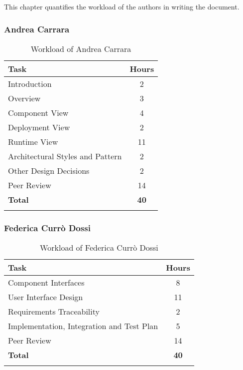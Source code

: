 This chapter quantifies the workload of the authors in writing the document.

\subsubsection{Andrea Carrara}
\renewcommand{\arraystretch}{1.5}
\begin{longtable}{|p{8.5cm}|c|}
    \hline \rowcolor{polimiblue!40}
    \textbf{Task} & \textbf{Hours} \\ \hline
    Introduction  & 2  \\ \hline
    Overview & 3 \\ \hline
    Component View & 4\\ \hline
    Deployment View & 2 \\ \hline
    Runtime View & 11 \\ \hline
    Architectural Styles and Pattern  & 2 \\ \hline
    Other Design Decisions  & 2 \\ \hline
    Peer Review & 14 \\ \hline
    \hline \rowcolor{polimiblue!40}
    \textbf{Total} & \textbf{40} \\ \hline
\caption{Workload of Andrea Carrara}
\end{longtable}

\subsubsection{Federica Currò Dossi}
\renewcommand{\arraystretch}{1.5}
\begin{longtable}{|p{8.5cm}|c|}
    \hline \rowcolor{polimiblue!40}
    \textbf{Task} & \textbf{Hours} \\ \hline
    Component Interfaces & 8\\ \hline
    User Interface Design & 11\\ \hline
    Requirements Traceability  & 2 \\ \hline
    Implementation, Integration and Test Plan  & 5 \\ \hline
    Peer Review & 14 \\ \hline
    \hline \rowcolor{polimiblue!40}
    \textbf{Total} & \textbf{40} \\ \hline
\caption{Workload of Federica Currò Dossi}
\end{longtable}
